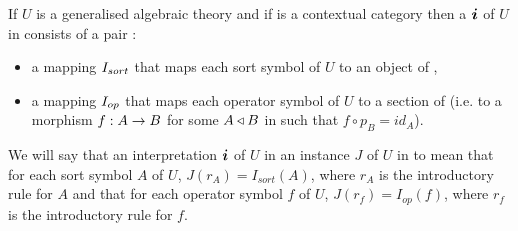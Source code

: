 \begin{definition}
If $U$ is a generalised algebraic theory  and if \catcw is a contextual category then
a  $\iI$ of  $U$ in \catcw consists of a pair :
\begin{itemize}
\item a mapping $I_{sort}$ that maps each sort symbol of $U$ to  an object of \catc,
\item a mapping $I_{op}$ that maps each operator symbol of $U$ to a section of \catcw (i.e. to a morphism $f: A \rightarrow B$ for some 
$A \triangleleft B$ in \catcw such that $f \circ p_B=id_A$).
\end{itemize}
\end{definition}


We will say that  an interpretation $\iI$ of $U$ in \catcw {} an  instance $J$ of $U$ in \catcw to mean that for each sort symbol $A$ of $U$,
$J(r_A) = I_{sort}(A)$, where $r_A$ is the introductory rule for $A$ and that for each operator symbol
$f$ of $U$,   $J(r_f) = I_{op}(f)$, where $r_f$ is the introductory rule for $f$.


